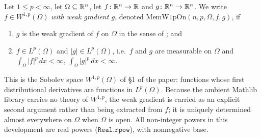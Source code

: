 \begin{definition}
Let $1\le p<\infty$, let $\Omega\subseteq\mathbb{R}^n$, let $f\colon\mathbb{R}^n\to\mathbb{R}$ and
$g\colon\mathbb{R}^n\to\mathbb{R}^n$. We write $f\in W^{1,p}(\Omega)$ \emph{with weak gradient
$g$}, denoted $\mathrm{MemW1pOn}(n,p,\Omega,f,g)$, if
\begin{enumerate}
\item $g$ is the weak gradient of $f$ on $\Omega$ in the sense of
  ; and
\item $f\in L^p(\Omega)$ and $|g|\in L^p(\Omega)$, i.e.\ $f$ and $g$ are
  measurable on $\Omega$ and $\int_\Omega|f|^p\,dx<\infty$,
  $\int_\Omega|g|^p\,dx<\infty$.
\end{enumerate}
This is the Sobolev space $W^{1,p}(\Omega)$ of \S1 of the paper: functions whose
first distributional derivatives are functions in $L^p(\Omega)$. Because the
ambient Mathlib library carries no theory of $W^{1,p}$, the weak gradient is
carried as an explicit second argument rather than being extracted from $f$;
it is uniquely determined almost everywhere on $\Omega$ when $\Omega$ is open.
All non-integer powers in this development are real powers
($\mathtt{Real.rpow}$), with nonnegative base.
\end{definition}
